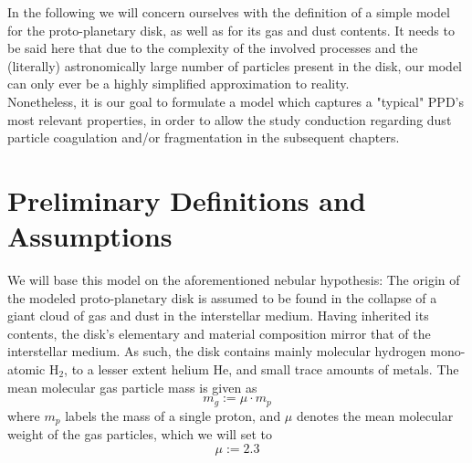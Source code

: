 In the following we will concern ourselves with the definition of a simple model
for the proto-planetary disk, as well as for its gas and dust contents. 
It needs to be said here that due to the complexity of the involved processes and the (literally)
astronomically large number of particles present in the disk, our model can only ever be 
a highly simplified approximation to reality. \\

Nonetheless, it is our goal to formulate a model which captures a "typical" PPD's most relevant
properties, in order to allow the study conduction regarding dust particle coagulation 
and/or fragmentation in the subsequent chapters. \\

\section{Preliminary Definitions and Assumptions}
\label{sec:first_assumptions_about_the_disk}

        We will base this model on the aforementioned
        nebular hypothesis: The origin of the modeled proto-planetary disk is assumed to be
        found in the collapse of a giant cloud of gas and dust in the interstellar medium.
        Having inherited its contents, the disk's elementary and material composition mirror
        that of the interstellar medium. As such, the disk contains mainly molecular hydrogen
        mono-atomic $\text{H}_2$, to a lesser extent helium $\text{He}$, and small trace amounts 
        of metals. 
        The mean molecular gas particle mass is given as
        \begin{equation}
            m_g := \mu\cdot m_p
        \end{equation}
        where $m_p$ labels the mass of a single proton, and $\mu$ denotes the mean molecular 
        weight of the gas particles, which we will set to
        \begin{equation}
            \mu := 2.3
        \end{equation}

